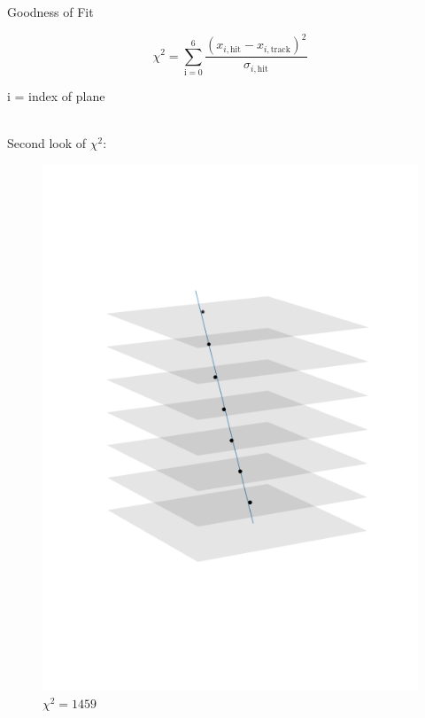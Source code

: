 \documentclass{beamer}
\begin{document}
\begin{frame}{Goodness of Fit}
    \begin{minipage}{.49\textwidth}
    \[ \chi^2 = \sum_{\text{i} = 0} ^6 \frac{ \left(
	    x _{i,\text{hit}} - x _{i,\text{track}} \right) ^2}{
	    \sigma _{i,\text{hit}}} \]
    \end{minipage}
    \begin{minipage}{.49\textwidth}
    i = index of plane
    \end{minipage}\\[.5cm]
    \LARGE Second look of \( \chi ^{2} \): \\[.5cm]
    \begin{minipage}{.32\textwidth}
    \begin{figure}[H]
	\centering 
	\includegraphics[trim=0 80 0 80,clip,width=\textwidth]{example_1459.png}
	\caption*{\( \chi^2 = 1459 \)}
    \end{figure}

\end{minipage}
\end{frame}
\end{document}
